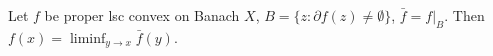 Let $f$ be proper lsc convex on Banach $X$, $B=\{z:\partial f(z)\neq\emptyset\}$, $\bar{f}=f|_B$. Then $f(x)=\liminf_{y\to x}\bar{f}(y)$.
